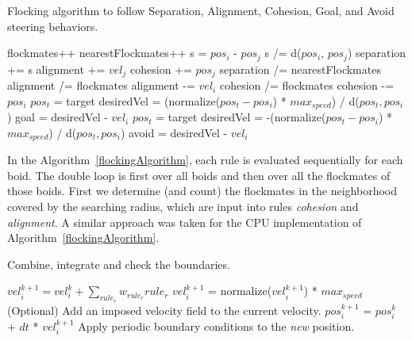 \begin{algorithm}
\caption{Flocking algorithm to follow Separation, Alignment, Cohesion, Goal, and Avoid steering behaviors.}
\label{flockingAlgorithm}
\begin{algorithmic}
	\STATE flockmates++
				\STATE nearestFlockmates++
				\STATE s = $pos_i$ - $pos_j$ 
				\STATE s /= d($pos_i$, $pos_j$) 
				\STATE separation += s
			\ENDIF
		\ENDIF
			\STATE alignment += $vel_j$
		\ENDIF
			\STATE cohesion += $pos_j$
		\ENDIF
	\ENDIF
\ENDFOR
{}
	\STATE separation /= nearestFlockmates
\ENDIF
{}
	\STATE alignment /=  flockmates
	\STATE alignment -= $vel_i$
\ENDIF
{}
	\STATE cohesion /=  flockmates
	\STATE cohesion -= $pos_i$
\ENDIF
{}
	\STATE $pos_t$ = target
	\STATE desiredVel = (normalize($pos_t - pos_i$) * $max_{speed}$) / d($pos_t, pos_i$) 
	\STATE goal = desiredVel - $vel_i$
\ENDIF
{}
	\STATE $pos_t$ = target
	\STATE desiredVel = -(normalize($pos_t - pos_i$) * $max_{speed}$) / d($pos_t, pos_i$) 
	\STATE avoid = desiredVel - $vel_i$
\ENDIF

\end{algorithmic}
\end{algorithm}

In the Algorithm~\ref{flockingAlgorithm}, each rule is evaluated sequentially for each boid. The double loop is first over all boids and then over all the flockmates of those boids. First we determine (and count) the flockmates in the neighborhood covered by the searching radius, which are input into rules \textit{cohesion} and \textit{alignment}. A similar approach was taken for the CPU implementation of Algorithm~\ref{flockingAlgorithm}. 

\vspace{32pt}
\begin{algorithm}
\caption{Combine, integrate and check the boundaries.}
\label{combineAlgorithm}
\begin{algorithmic}
\STATE $vel_i^{k+1} = vel_i^{k} + \sum_{rule_r} w_{rule_r} {rule_r} $
	\STATE $vel_i^{k+1}$ = normalize($vel_i^{k+1}$) * $max_{speed}$
\ENDIF  
\STATE (Optional) Add an imposed velocity field to the current velocity.
\STATE $pos_i^{k+1}$ = $pos_i^{k}$ + $dt$ * $vel_i^{k+1}$
\STATE Apply periodic boundary conditions to the \textit{new} position.
\end{algorithmic}
\end{algorithm} 
\vspace{32pt}

